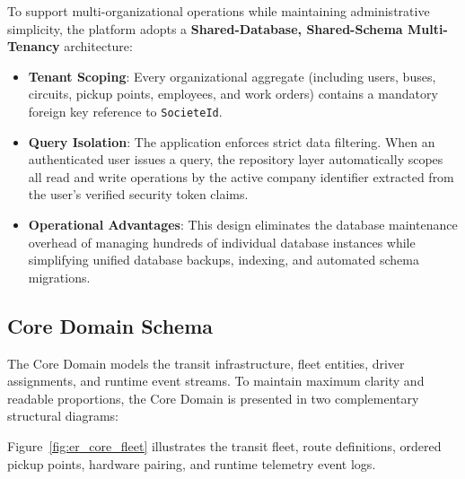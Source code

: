 To support multi-organizational operations while maintaining administrative simplicity, the platform adopts a \textbf{Shared-Database, Shared-Schema Multi-Tenancy} architecture:
\begin{itemize}
  \item \textbf{Tenant Scoping}: Every organizational aggregate (including users, buses, circuits, pickup points, employees, and work orders) contains a mandatory foreign key reference to \texttt{SocieteId}.
  \item \textbf{Query Isolation}: The application enforces strict data filtering. When an authenticated user issues a query, the repository layer automatically scopes all read and write operations by the active company identifier extracted from the user's verified security token claims.
  \item \textbf{Operational Advantages}: This design eliminates the database maintenance overhead of managing hundreds of individual database instances while simplifying unified database backups, indexing, and automated schema migrations.
\end{itemize}

\subsection{Core Domain Schema}
\label{sec:core_schema}

The Core Domain models the transit infrastructure, fleet entities, driver assignments, and runtime event streams. To maintain maximum clarity and readable proportions, the Core Domain is presented in two complementary structural diagrams:

Figure~\ref{fig:er_core_fleet} illustrates the transit fleet, route definitions, ordered pickup points, hardware pairing, and runtime telemetry event logs.

